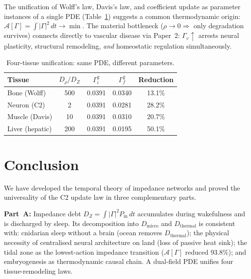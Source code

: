 \documentclass[aps,pre,twocolumn,superscriptaddress,floatfix]{revtex4-2}
\begin{document}
The unification of Wolff's law, Davis's law, and
coefficient update as parameter instances of a single
PDE (Table~\ref{tab:morphogenesis})
suggests a common thermodynamic origin:
$\mathcal{A}[\Gamma] = \int |\Gamma|^2\,dt \to \min$.
The material bottleneck ($\rho \to 0 \Rightarrow$
only degradation survives) connects directly to
vascular disease via Paper~2:
$\Gamma_v\!\uparrow$ arrests neural plasticity,
structural remodeling, \emph{and} homeostatic regulation
simultaneously.

\begin{table}[h]
  \centering
  \caption{Four-tissue unification: same PDE, different parameters.}
  \label{tab:morphogenesis}
  \begin{tabular}{lcccc}
  \hline
  Tissue & $D_\rho/D_Z$ & $\Gamma^2_i$ & $\Gamma^2_f$ & Reduction \\
  \hline
  Bone (Wolff)     & 500 & 0.0391 & 0.0340 & 13.1\% \\
  Neuron (C2)      &   2 & 0.0391 & 0.0281 & 28.2\% \\
  Muscle (Davis)   &  10 & 0.0391 & 0.0310 & 20.7\% \\
  Liver (hepatic)  & 200 & 0.0391 & 0.0195 & 50.1\% \\
  \hline
  \end{tabular}
\end{table}


\section{Conclusion}
\label{sec:conclusion}

We have developed the temporal theory of impedance networks
and proved the universality of the C2 update law
in three complementary parts.

\textbf{Part~A:}
Impedance debt $D_Z = \int |\Gamma|^2 P_{\mathrm{in}}\,dt$
accumulates during wakefulness and is discharged by sleep.
Its decomposition into $D_{\mathrm{micro}}$ and
$D_{\mathrm{thermal}}$ is consistent with:
cnidarian sleep without a brain (ocean removes
$D_{\mathrm{thermal}}$);
the physical necessity of centralised neural architecture
on land (loss of passive heat sink);
the tidal zone as the lowest-action impedance transition
($\mathcal{A}[\Gamma]$ reduced 93.8\%);
and embryogenesis as thermodynamic causal chain.
A dual-field PDE unifies four tissue-remodeling laws.
\end{document}
